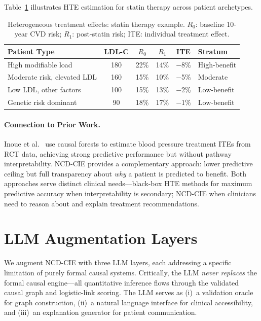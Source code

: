 \documentclass[runningheads]{llncs}
\begin{document}
Table~\ref{tab:hte} illustrates HTE estimation for statin therapy
across patient archetypes.

\renewcommand{\arraystretch}{1.1}
\begin{table}[t]
\centering
\caption{Heterogeneous treatment effects: statin therapy example.
$R_0$: baseline 10-year CVD risk; $R_1$: post-statin risk;
ITE: individual treatment effect.}\label{tab:hte}
\small
\begin{tabular}{@{}lccccl@{}}
\toprule
\textbf{Patient Type} & \textbf{LDL-C} & \textbf{$R_0$} & \textbf{$R_1$} &
\textbf{ITE} & \textbf{Stratum} \\
\midrule
High modifiable load & 180 & 22\% & 14\% & $-$8\% & High-benefit \\
Moderate risk, elevated LDL & 160 & 15\% & 10\% & $-$5\% & Moderate \\
Low LDL, other factors & 100 & 15\% & 13\% & $-$2\% & Low-benefit \\
Genetic risk dominant & 90 & 18\% & 17\% & $-$1\% & Low-benefit \\
\bottomrule
\end{tabular}
\end{table}
\renewcommand{\arraystretch}{1.0}

\paragraph{Connection to Prior Work.}
Inoue et al.~\cite{inoue2023causalforest} use causal forests to
estimate blood pressure treatment ITEs from RCT data, achieving
strong predictive performance but without pathway interpretability.
NCD-CIE provides a complementary approach: lower predictive
ceiling but full transparency about \emph{why} a patient is
predicted to benefit.
Both approaches serve distinct clinical needs---black-box HTE
methods for maximum predictive accuracy when interpretability is
secondary; NCD-CIE when clinicians need to reason about and
explain treatment recommendations.

\section{LLM Augmentation Layers}\label{sec:llm}

We augment NCD-CIE with three LLM layers, each addressing a
specific limitation of purely formal causal systems.
Critically, the LLM \emph{never replaces} the formal causal
engine---all quantitative inference flows through the
validated causal graph and logistic-link scoring.
The LLM serves as (i)~a validation oracle for graph construction,
(ii)~a natural language interface for clinical accessibility, and
(iii)~an explanation generator for patient communication.
\end{document}
